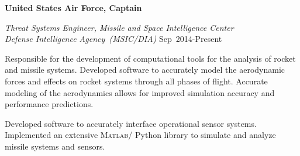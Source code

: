 \documentclass[10pt]{article}
\providecommand\Matlab{\textsc{Matlab}}
\begin{document}
\textbf{United States Air Force, Captain}
\begin{lonelist}

\item[] \textit{Threat Systems Engineer, Missile and Space Intelligence Center \\
				Defense Intelligence Agency~(MSIC/DIA)}
				\hfill {Sep~2014-Present}
		\begin{innerlist}
			\item Responsible for the development of computational tools for the analysis of rocket and missile systems.
			Developed software to accurately model the aerodynamic forces and effects on rocket systems through all phases of flight.
			Accurate modeling of the aerodynamics allows for improved simulation accuracy and performance predictions.
			\item Developed software to accurately interface operational sensor systems.
			Implemented an extensive \Matlab / Python library to simulate and analyze missile systems and sensors. 
		\end{innerlist}
		

\end{lonelist}
\end{document}
